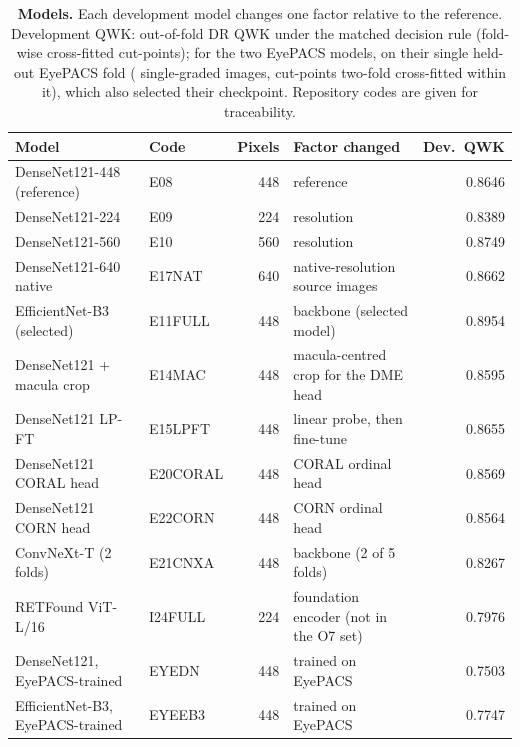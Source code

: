 \begin{table}[t]
\caption{\textbf{Models.} Each development model changes one factor relative
to the reference. Development QWK: out-of-fold DR QWK under the matched decision rule
(fold-wise cross-fitted cut-points); for the two EyePACS models, on their single held-out EyePACS fold
( single-graded images, cut-points two-fold cross-fitted within it), which also selected
their checkpoint. Repository codes are given for traceability.}\label{tab:models}
\centering{}\footnotesize\setlength{\tabcolsep}{3pt}
\begin{tabular}{@{}p{4.1cm}lrp{3.7cm}r@{}}
\toprule
Model & Code & Pixels & Factor changed & Dev.\ QWK \\
\midrule
DenseNet121-448 (reference) & E08 & 448 & reference & 0.8646 \\
DenseNet121-224 & E09 & 224 & resolution & 0.8389 \\
DenseNet121-560 & E10 & 560 & resolution & 0.8749 \\
DenseNet121-640 native & E17NAT & 640 & native-resolution source images & 0.8662 \\
EfficientNet-B3 (selected) & E11FULL & 448 & backbone (selected model) & 0.8954 \\
DenseNet121 + macula crop & E14MAC & 448 & macula-centred crop for the DME head & 0.8595 \\
DenseNet121 LP-FT & E15LPFT & 448 & linear probe, then fine-tune & 0.8655 \\
DenseNet121 CORAL head & E20CORAL & 448 & CORAL ordinal head & 0.8569 \\
DenseNet121 CORN head & E22CORN & 448 & CORN ordinal head & 0.8564 \\
ConvNeXt-T (2 folds) & E21CNXA & 448 & backbone (2 of 5 folds) & 0.8267 \\
RETFound ViT-L/16 & I24FULL & 224 & foundation encoder (not in the O7 set) & 0.7976 \\
DenseNet121, EyePACS-trained & EYEDN & 448 & trained on EyePACS & 0.7503 \\
EfficientNet-B3, EyePACS-trained & EYEEB3 & 448 & trained on EyePACS & 0.7747 \\
\bottomrule
\end{tabular}
\end{table}

